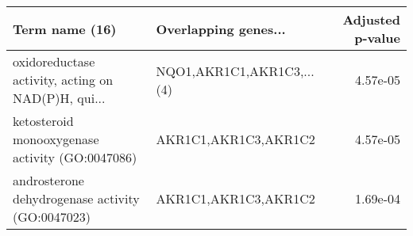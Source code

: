 \begin{tabular}{llr}
\toprule
                                    Term name (16) &      Overlapping genes... &  Adjusted p-value \\
\midrule
oxidoreductase activity, acting on NAD(P)H, qui... & NQO1,AKR1C1,AKR1C3,...(4) &          4.57e-05 \\
   ketosteroid monooxygenase activity (GO:0047086) &      AKR1C1,AKR1C3,AKR1C2 &          4.57e-05 \\
  androsterone dehydrogenase activity (GO:0047023) &      AKR1C1,AKR1C3,AKR1C2 &          1.69e-04 \\
\bottomrule
\end{tabular}
